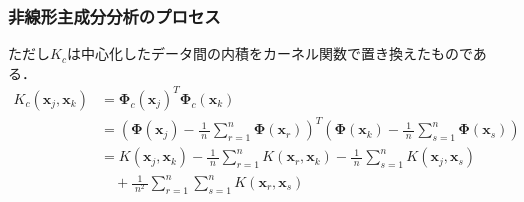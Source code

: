 \documentclass[dvipdfmx,cjk]{beamer}
\theoremstyle{example}
\begin{document}
\begin{frame}
    \frametitle{非線形主成分分析のプロセス}
    ただし$K_c$は中心化したデータ間の内積をカーネル関数で置き換えたものである．
    \begin{align*}
        K_c(\boldsymbol{x}_j,\boldsymbol{x}_k) & ={\boldsymbol{\Phi}_c(\boldsymbol{x}_j)}^T\boldsymbol{\Phi}_c(\boldsymbol{x}_k)                                                                                                                                                       \\
                                               & =\left(\boldsymbol{\Phi}(\boldsymbol{x}_j)-\frac{1}{\;n\;}\sum_{r=1}^{n}\boldsymbol{\Phi}(\boldsymbol{x}_r)\right)^T\left(\boldsymbol{\Phi}(\boldsymbol{x}_k)-\frac{1}{\;n\;}\sum_{s=1}^{n}\boldsymbol{\Phi}(\boldsymbol{x}_s)\right) \\
                                               & =K(\boldsymbol{x}_j,\boldsymbol{x}_k)-\frac{1}{\;n\;}\sum_{r=1}^{n}K(\boldsymbol{x}_r,\boldsymbol{x}_k)-\frac{1}{\;n\;}\sum_{s=1}^{n}K(\boldsymbol{x}_j,\boldsymbol{x}_s)                                                             \\&\quad+\frac{1}{\;n^2\;}\sum_{r=1}^{n}\sum_{s=1}^{n}K(\boldsymbol{x}_r,\boldsymbol{x}_s)
    \end{align*}
\end{frame}
\end{document}
